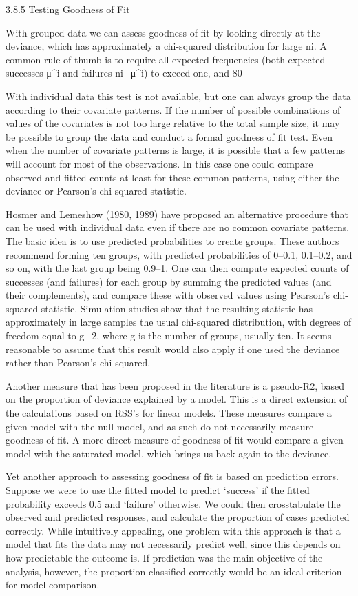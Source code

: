 3.8.5 Testing Goodness of Fit

With grouped data we can assess goodness of fit by looking directly at the deviance, which has approximately a chi-squared distribution for large ni. A common rule of thumb is to require all expected frequencies (both expected successes μ^i and failures ni−μ^i) to exceed one, and 80%

With individual data this test is not available, but one can always group the data according to their covariate patterns. If the number of possible combinations of values of the covariates is not too large relative to the total sample size, it may be possible to group the data and conduct a formal goodness of fit test. Even when the number of covariate patterns is large, it is possible that a few patterns will account for most of the observations. In this case one could compare observed and fitted counts at least for these common patterns, using either the deviance or Pearson’s chi-squared statistic.

Hosmer and Lemeshow (1980, 1989) have proposed an alternative procedure that can be used with individual data even if there are no common covariate patterns. The basic idea is to use predicted probabilities to create groups. These authors recommend forming ten groups, with predicted probabilities of 0–0.1, 0.1–0.2, and so on, with the last group being 0.9–1. One can then compute expected counts of successes (and failures) for each group by summing the predicted values (and their complements), and compare these with observed values using Pearson’s chi-squared statistic. Simulation studies show that the resulting statistic has approximately in large samples the usual chi-squared distribution, with degrees of freedom equal to g−2, where g is the number of groups, usually ten. It seems reasonable to assume that this result would also apply if one used the deviance rather than Pearson’s chi-squared.

Another measure that has been proposed in the literature is a pseudo-R2, based on the proportion of deviance explained by a model. This is a direct extension of the calculations based on RSS’s for linear models. These measures compare a given model with the null model, and as such do not necessarily measure goodness of fit. A more direct measure of goodness of fit would compare a given model with the saturated model, which brings us back again to the deviance.

Yet another approach to assessing goodness of fit is based on prediction errors. Suppose we were to use the fitted model to predict ‘success’ if the fitted probability exceeds 0.5 and ‘failure’ otherwise. We could then crosstabulate the observed and predicted responses, and calculate the proportion of cases predicted correctly. While intuitively appealing, one problem with this approach is that a model that fits the data may not necessarily predict well, since this depends on how predictable the outcome is. If prediction was the main objective of the analysis, however, the proportion classified correctly would be an ideal criterion for model comparison.

